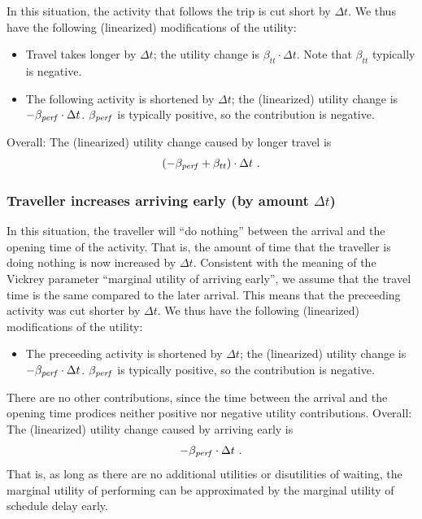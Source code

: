 In this situation, the activity that follows the trip is cut short by  $\Delta t$. We thus have the following (linearized) modifications  of the utility:
\begin{itemize}

\item Travel takes longer by $\Delta t$; the utility change is  $\beta_{tt} \cdot \Delta t$. Note that $\beta_{tt}$ typically is  negative.

\item The following activity is shortened by $\Delta t$; the (linearized)  utility change is $- \beta_{\it perf} \cdot \Delta t$.  $\beta_{\it perf}$ is  typically positive, so the contribution is negative.

\end{itemize}
Overall: The (linearized) utility change caused by longer travel is
\[
( - \beta_{\it perf} + \beta_{tt} ) \cdot \Delta t \ .
\]


\subsubsection{Traveller increases arriving early (by amount $\Delta t$)}

In this situation, the traveller will ``do nothing'' between the  arrival and the opening time of the activity. That is, the amount  of time that the traveller is doing nothing is now increased by  $\Delta t$. Consistent with the meaning of the Vickrey parameter  ``marginal utility of arriving early'', we assume that the travel time is  the same compared to the later arrival. This means that the preceeding  activity was cut shorter by $\Delta t$. We thus have the following  (linearized) modifications of the utility:
\begin{itemize}

\item The preceeding activity is shortened by $\Delta t$; the
(linearized) utility change is $- \beta_{\it perf} \cdot \Delta t$.
	$\beta_{\it perf}$ is typically positive, so the contribution is
	negative.

\end{itemize}
There are no other contributions, since the time between the  arrival and the opening time prodices neither positive nor negative  utility contributions. Overall: The (linearized) utility change  caused by arriving early is
\[
- \beta_{\it perf} \cdot \Delta t \ .
\]
That is, as long as there are no  additional utilities or disutilities of waiting, the marginal utility of  performing can be approximated by the marginal utility of schedule  delay early.

